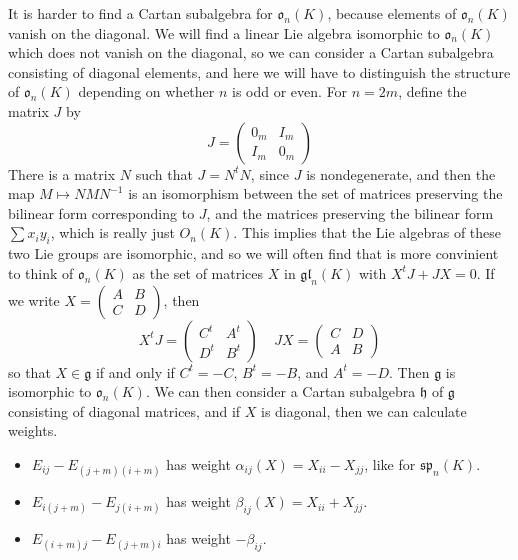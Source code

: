 \begin{example}
    It is harder to find a Cartan subalgebra for $\mathfrak{o}_n(K)$, because elements of $\mathfrak{o}_n(K)$ vanish on the diagonal. We will find a linear Lie algebra isomorphic to $\mathfrak{o}_n(K)$ which does not vanish on the diagonal, so we can consider a Cartan subalgebra consisting of diagonal elements, and here we will have to distinguish the structure of $\mathfrak{o}_n(K)$ depending on whether $n$ is odd or even. For $n = 2m$, define the matrix $J$ by
    \[ J = \begin{pmatrix} 0_m & I_m \\ I_m & 0_m \end{pmatrix} \]
    There is a matrix $N$ such that $J = N^tN$, since $J$ is nondegenerate, and then the map $M \mapsto NMN^{-1}$ is an isomorphism between the set of matrices preserving the bilinear form corresponding to $J$, and the matrices preserving the bilinear form $\sum x_i y_i$, which is really just $O_n(K)$. This implies that the Lie algebras of these two Lie groups are isomorphic, and so we will often find that is more convinient to think of $\mathfrak{o}_n(K)$ as the set of matrices $X$ in $\mathfrak{gl}_n(K)$ with $X^tJ + JX = 0$. If we write $X = \left( \begin{smallmatrix} A & B \\ C & D \end{smallmatrix} \right)$, then
    \[ X^tJ = \begin{pmatrix} C^t & A^t \\ D^t & B^t \end{pmatrix}\ \ \ \ \ JX = \begin{pmatrix} C & D \\ A & B \end{pmatrix} \]
    so that $X \in \mathfrak{g}$ if and only if $C^t = - C$, $B^t = -B$, and $A^t = -D$. Then $\mathfrak{g}$ is isomorphic to $\mathfrak{o}_n(K)$. We can then consider a Cartan subalgebra $\mathfrak{h}$ of $\mathfrak{g}$ consisting of diagonal matrices, and if $X$ is diagonal, then we can calculate weights.
    \begin{itemize}
        \item $E_{ij} - E_{(j+m)(i+m)}$ has weight $\alpha_{ij}(X) = X_{ii} - X_{jj}$, like for $\mathfrak{sp}_n(K)$.
        \item $E_{i(j+m)} - E_{j(i+m)}$ has weight $\beta_{ij}(X) = X_{ii} + X_{jj}$.
        \item $E_{(i+m)j} - E_{(j+m)i}$ has weight $-\beta_{ij}$.

\end{itemize}
\end{example}
